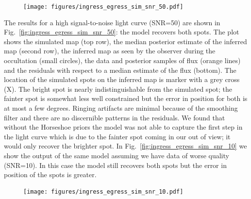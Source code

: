 \documentclass[linenumbers,modern]{aastex62}
\begin{document}
\begin{figure}[t!]
    \begin{centering}
    \texttt{[image: figures/ingress\_egress\_sim\_snr\_50.pdf]}
    \end{centering}
\end{figure}


The results for a high signal-to-noise light curve (SNR=50) are shown in Fig.~\ref{fig:ingress_egress_sim_snr_50}: the model recovers both spots.
The plot shows the simulated map (top row), the median posterior estimate of the inferred map (second row), the inferred map as seen by the observer during the occultation (small circles), the data and posterior samples of flux (orange lines) and the residuals with respect to a median estimate of the flux (bottom). 
The location of the simulated spots on the inferred map is marker with a grey cross (X).
The bright spot is nearly indistinguishable from the simulated spot; the fainter spot is somewhat less well constrained but the error in position for both is at most a few degrees.
Ringing artifacts are minimal because of the smoothing filter and there are no discernible patterns in the residuals.
We found that without the Horseshoe priors the model was not able to capture the first step in the light curve which is due to the fainter spot coming in our out of view; it would only recover the brighter spot.
In Fig.~\ref{fig:ingress_egress_sim_snr_10} we show the output of the same model assuming we have data of worse quality (SNR=10). 
In this case the model still recovers both spots but the error in position of the spots is greater.

\begin{figure}[t!]
    \begin{centering}
        \texttt{[image: figures/ingress\_egress\_sim\_snr\_10.pdf]}
    \end{centering}
\end{figure}
\end{document}
